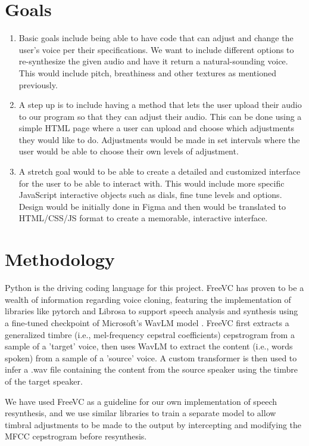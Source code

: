\documentclass{article}
\begin{document}
\section{Goals}\label{sec:page_size}
\begin{enumerate}
    \item Basic goals include being able to have code that can adjust and change the user's voice per their specifications. We want to include different options to re-synthesize the given audio and have it return a natural-sounding voice. This would include pitch, breathiness and other textures as mentioned previously.
    \item A step up is to include having a method that lets the user upload their audio to our program so that they can adjust their audio. This can be done using a simple HTML page where a user can upload and choose which adjustments they would like to do. Adjustments would be made in set intervals where the user would be able to choose their own levels of adjustment.
    \item A stretch goal would to be able to create a detailed and customized interface for the user to be able to interact with. This would include more specific JavaScript interactive objects such as dials, fine tune levels and options. Design would be initially done in Figma and then would be translated to HTML/CSS/JS format to create a memorable, interactive interface.
\end{enumerate}


\section{Methodology}

Python is the driving coding language for this project. FreeVC \cite{Li22} has proven to be a wealth of information regarding voice cloning, featuring the implementation of libraries like pytorch \cite{PyTorch} and Librosa \cite{Librosa} to support speech analysis and synthesis using a fine-tuned checkpoint of Microsoft's WavLM model \cite{WavLM}. FreeVC first extracts a generalized timbre (i.e., mel-frequency cepstral coefficients) cepstrogram from a sample of a 'target' voice, then uses WavLM to extract the content (i.e., words spoken) from a sample of a 'source' voice. A custom transformer is then used to infer a .wav file containing the content from the source speaker using the timbre of the target speaker.

We have used FreeVC as a guideline for our own implementation of speech resynthesis, and we use similar libraries to train a separate model to allow timbral adjustments to be made to the output by intercepting and modifying the MFCC cepstrogram before resynthesis.
\end{document}
